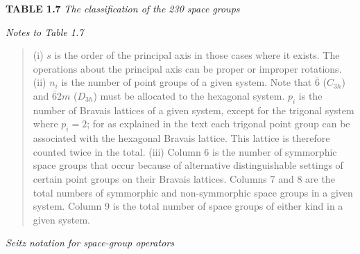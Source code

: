 \documentclass[11pt,a4paper,twoside,openright]{book}
\begin{document}
\begin{minipage}{\textwidth}
\centering\textbf{TABLE 1.7}
\textit{The classification of the 230 space groups}

\noindent{}
\end{minipage}
\medskip

\textit{Notes to Table 1.7}

\begin{quote}(i) $s$ is the order of the principal axis in those cases where it exists. The operations about the principal axis can be proper or improper rotations. (ii) $n_{i}$ is the number of point groups of a given system. Note that $\bar{6}$ ($C_{3h}$) and $\bar{6}2m$ ($D_{3h}$) must be allocated to the hexagonal system. $p_{i}$ is the number of Bravais lattices of a given system, except for the trigonal system where $p_{i} = 2$; for as explained in the text each trigonal point group can be associated with the hexagonal Bravais lattice. This lattice is therefore counted twice in the total. (iii) Column 6 is the number of symmorphic space groups that occur because of alternative distinguishable settings of certain point groups on their Bravais lattices. Columns 7 and 8 are the total numbers of symmorphic and non-symmorphic space groups in a given system. Column 9 is the total number of space groups of either kind in a given system.\end{quote}

\textit{Seitz notation for space-group operators}
\end{document}
